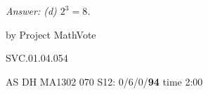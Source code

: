 
{\it Answer:  (d) $2^3=8$.}

\medskip
by Project MathVote

SVC.01.04.054


AS DH MA1302 070 S12: 0/6/0/{\bf94} time 2:00  \\
